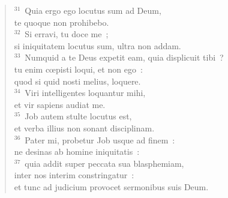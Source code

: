 \begin{flushleft}
\begin{verse}
${}^{31}$~Quia ergo ego locutus sum ad Deum,\\ te quoque non prohibebo.\\
${}^{32}$~Si erravi, tu doce me~;\\ si iniquitatem locutus sum, ultra non addam.\\
${}^{33}$~Numquid a te Deus expetit eam, quia displicuit tibi~?\\ tu enim cœpisti loqui, et non ego~:\\ quod si quid nosti melius, loquere.\\
${}^{34}$~Viri intelligentes loquantur mihi,\\ et vir sapiens audiat me.\\
${}^{35}$~Job autem stulte locutus est,\\ et verba illius non sonant disciplinam.\\
${}^{36}$~Pater mi, probetur Job usque ad finem~:\\ ne desinas ab homine iniquitatis~:\\
${}^{37}$~quia addit super peccata sua blasphemiam,\\ inter nos interim constringatur~:\\ et tunc ad judicium provocet sermonibus suis Deum.\end{verse}\end{flushleft}


